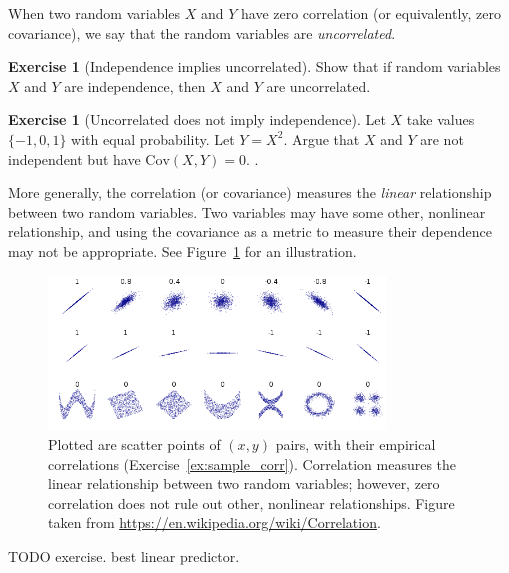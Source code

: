 \documentclass[11pt]{article}
\theoremstyle{definition}
\newtheorem{exercise}[]{Exercise}
\newcommand{\cov}{\text{Cov}}
\begin{document}
When two random variables $X$ and $Y$ have zero correlation
(or equivalently, zero covariance),
we say that the random variables are
\textit{uncorrelated}.

\begin{exercise}[Independence implies uncorrelated]
Show that if random variables $X$ and $Y$ are independence,
then $X$ and $Y$ are uncorrelated.
\label{ex:indep_corr}
\end{exercise}

\begin{exercise}[Uncorrelated does not imply independence]
  Let $X$ take values $\{-1, 0, 1\}$ with equal probability.
  Let $Y = X^2$.
  Argue that $X$ and $Y$ are not independent but
  have $\cov(X, Y) = 0$. .
\end{exercise}

More generally, the correlation (or covariance) measures
the \textit{linear} relationship between two random
variables.
Two variables may have some other, nonlinear
relationship, and using the covariance
as a metric to measure their dependence
may not be appropriate.
See Figure~\ref{fig:wiki_corr} for an illustration.

\begin{figure}[!h]
  \centering
  \includegraphics[width = 0.8\textwidth]{./figures/wiki_corr_example.png}
  \caption{Plotted are scatter points of
  $(x,y)$ pairs, with their empirical correlations
  (Exercise~\ref{ex:sample_corr}). Correlation measures the linear relationship
  between two random variables; however, zero correlation
  does not rule out other, nonlinear relationships.
  Figure taken from \url{https://en.wikipedia.org/wiki/Correlation}.}
  \label{fig:wiki_corr}
\end{figure}

TODO exercise. best linear predictor. 
\end{document}
